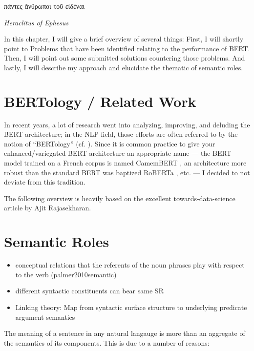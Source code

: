 \label{chap:2_approach}

\epigraph{\textgreek{πάντες ἄνθρωποι τοῦ εἰδέναι}}{\textit{Heraclitus of Ephesus}}


In this chapter, I will give a brief overview of several things:
First, I will shortly point to Problems that have been identified
relating to the performance of BERT. Then, I will point out some
submitted solutions countering those problems. And lastly, I will
describe my approach and elucidate the thematic of semantic roles.


\section{BERTology / Related Work}

In recent years, a lot of research went into analyzing, improving, and deluding the BERT architecture;
in the NLP field, those efforts are often referred to by the notion of ``BERTology'' (cf. \cite{rogers2020primer}).
Since it is common practice to give your enhanced/variegated BERT architecture an appropriate name --- the BERT model
trained on  a French corpus is named CamemBERT \cite{martin2019camembert}, an architecture more robust than the
standard BERT was baptized RoBERTa \cite{liu2019roberta}, etc. --- I decided to not deviate from this tradition.

The following overview is heavily based on the excellent towards-data-science article by Ajit Rajasekharan.


\section{Semantic Roles}


\begin{itemize}
  \item conceptual relations that the referents of the noun phrases play with respect to the verb (palmer2010semantic)
  \item different syntactic constituents can bear same SR
  \item Linking theory: Map from syntactic surface structure to underlying predicate argument semantics
\end{itemize}

The meaning of a sentence in any natural langauge is more than an aggregate of the semantics
of its components. This is due to a number of reasons:

